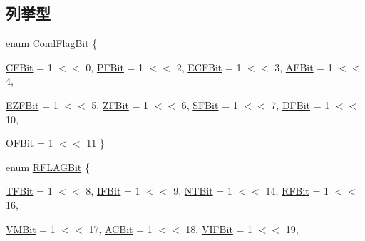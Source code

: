 \subsection*{列挙型}
\begin{DoxyCompactItemize}
\item 
enum \hyperlink{namespaceX86ISA_a77b692cff87fc41556e3b66c6bd280ef}{CondFlagBit} \{ \par
\hyperlink{namespaceX86ISA_a77b692cff87fc41556e3b66c6bd280efa62ac5fecddec7e35f26fe6c1dd9b314d}{CFBit} =  1 $<$$<$ 0, 
\hyperlink{namespaceX86ISA_a77b692cff87fc41556e3b66c6bd280efa798bced7abb6bf2610b74f95e343f704}{PFBit} =  1 $<$$<$ 2, 
\hyperlink{namespaceX86ISA_a77b692cff87fc41556e3b66c6bd280efa7b80af3e8a80d7602d61c112b3586cb6}{ECFBit} =  1 $<$$<$ 3, 
\hyperlink{namespaceX86ISA_a77b692cff87fc41556e3b66c6bd280efa1bb29e738d486a33fd9176959eb32f7a}{AFBit} =  1 $<$$<$ 4, 
\par
\hyperlink{namespaceX86ISA_a77b692cff87fc41556e3b66c6bd280efa76692c30605c03a1c15022ac59c5786f}{EZFBit} =  1 $<$$<$ 5, 
\hyperlink{namespaceX86ISA_a77b692cff87fc41556e3b66c6bd280efa7e10a81d022d2c831c3b5f18e6a07083}{ZFBit} =  1 $<$$<$ 6, 
\hyperlink{namespaceX86ISA_a77b692cff87fc41556e3b66c6bd280efac86653d6637c179c8efd1e61b35d446b}{SFBit} =  1 $<$$<$ 7, 
\hyperlink{namespaceX86ISA_a77b692cff87fc41556e3b66c6bd280efa61ef7c21faf294255f08fc10a4c8cdb1}{DFBit} =  1 $<$$<$ 10, 
\par
\hyperlink{namespaceX86ISA_a77b692cff87fc41556e3b66c6bd280efa9e94f6bac88df7cacaba4b3aaa20aca0}{OFBit} =  1 $<$$<$ 11
 \}
\item 
enum \hyperlink{namespaceX86ISA_a62679c97fcb78e0d10a9d535fa1872ff}{RFLAGBit} \{ \par
\hyperlink{namespaceX86ISA_a62679c97fcb78e0d10a9d535fa1872ffaff4bc5bb068087b5a60c0ee24e0a29f0}{TFBit} =  1 $<$$<$ 8, 
\hyperlink{namespaceX86ISA_a62679c97fcb78e0d10a9d535fa1872ffa9ce95c4f2927df56bcd64593cca64162}{IFBit} =  1 $<$$<$ 9, 
\hyperlink{namespaceX86ISA_a62679c97fcb78e0d10a9d535fa1872ffa2e4c424230ab14f82b01480fe66216be}{NTBit} =  1 $<$$<$ 14, 
\hyperlink{namespaceX86ISA_a62679c97fcb78e0d10a9d535fa1872ffade3d04d81006ce5910c0e584281686fe}{RFBit} =  1 $<$$<$ 16, 
\par
\hyperlink{namespaceX86ISA_a62679c97fcb78e0d10a9d535fa1872ffa5df8213351f0be145e4d27a90e32fcbf}{VMBit} =  1 $<$$<$ 17, 
\hyperlink{namespaceX86ISA_a62679c97fcb78e0d10a9d535fa1872ffa6b06bdf7f2dbfd0a2b9e12b72c9b1819}{ACBit} =  1 $<$$<$ 18, 
\hyperlink{namespaceX86ISA_a62679c97fcb78e0d10a9d535fa1872ffa07c40291eb2790c9a894da68e801ebc9}{VIFBit} =  1 $<$$<$ 19, 

\end{DoxyCompactItemize}
